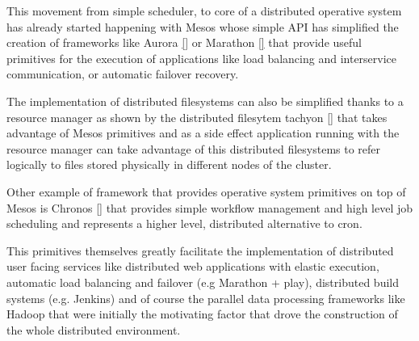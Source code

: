 \documentclass{svjour3}                     %
\begin{document}
This movement from simple scheduler, to core of a distributed
operative system has already started happening with Mesos whose simple
API has simplified the creation of frameworks like Aurora \ref{} or
Marathon \ref{} that provide useful primitives for the execution
of applications like load balancing and interservice communication,
or automatic failover recovery.

The implementation of distributed filesystems can also be simplified
thanks to a resource manager as shown by the distributed filesytem
tachyon \ref{} that takes advantage of Mesos primitives and as a side
effect application running with the resource manager can take
advantage of this distributed filesystems to refer logically to
files stored physically in different nodes of the cluster.

Other example of framework that provides operative system primitives
on top of Mesos is Chronos \ref{} that provides simple workflow
management and high level job scheduling and represents a higher
level, distributed alternative to cron.

This primitives themselves greatly facilitate the implementation of
distributed user facing services like distributed web applications
with elastic execution, automatic load balancing and failover (e.g
Marathon + play), distributed build systems (e.g. Jenkins) and of
course the parallel data processing frameworks like Hadoop that were
initially the motivating factor that drove the construction of the
whole distributed environment.


    
\end{document}
